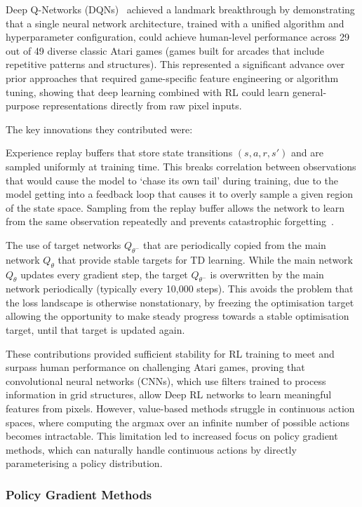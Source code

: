 Deep Q-Networks (DQNs)~\citep{mnih_2015_humanlevel} achieved a landmark breakthrough by demonstrating that a single neural network architecture, trained with a unified algorithm and hyperparameter configuration, could achieve human-level performance across 29 out of 49 diverse classic Atari games (games built for arcades that include repetitive patterns and structures). This represented a significant advance over prior approaches that required game-specific feature engineering or algorithm tuning, showing that deep learning combined with RL could learn general-purpose representations directly from raw pixel inputs.

The key innovations they contributed were:

Experience replay buffers that store state transitions $(s, a, r, s')$ and are sampled uniformly at training time. This breaks correlation between observations that would cause the model to `chase its own tail' during training, due to the model getting into a feedback loop that causes it to overly sample a given region of the state space. Sampling from the replay buffer allows the network to learn from the same observation repeatedly and prevents catastrophic forgetting~\citep{mnih_2015_humanlevel}.

The use of target networks $Q_{\theta^-}$ that are periodically copied from the main network $Q_\theta$ that provide stable targets for TD learning. While the main network $Q_\theta$ updates every gradient step, the target $Q_{\theta^-}$ is overwritten by the main network periodically (typically every 10,000 steps). This avoids the problem that the loss landscape is otherwise nonstationary, by freezing the optimisation target allowing the opportunity to make steady progress towards a stable optimisation target, until that target is updated again.

These contributions provided sufficient stability for RL training to meet and surpass human performance on challenging Atari games, proving that convolutional neural networks (CNNs), which use filters trained to process information in grid structures, allow Deep RL networks to learn meaningful features from pixels. However, value-based methods struggle in continuous action spaces, where computing the argmax over an infinite number of possible actions becomes intractable. This limitation led to increased focus on policy gradient methods, which can naturally handle continuous actions by directly parameterising a policy distribution.

\subsubsection{Policy Gradient Methods}\label{subsubsec:policy_gradient_methods}

